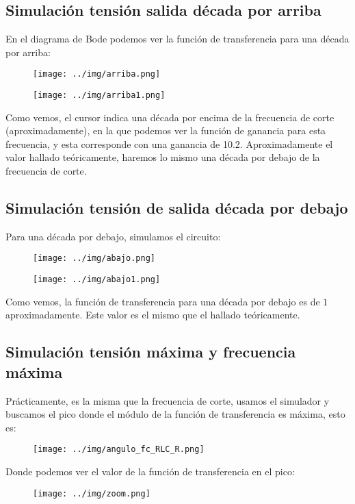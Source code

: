 \documentclass[11pt,letterpaper]{article}
\begin{document}
\subsection{Simulación tensión salida década por arriba}
En el diagrama de Bode podemos ver la función de transferencia para una década por arriba:
\begin{figure}[H]
    \centering
    \texttt{[image: ../img/arriba.png]}
    \label{fig:}
\end{figure}
\begin{figure}[H]
    \centering
    \texttt{[image: ../img/arriba1.png]}
    \label{fig:}
\end{figure}
Como vemos, el cursor indica una década por encima de la frecuencia de corte (aproximadamente), en la que podemos ver la función de ganancia para esta frecuencia, y esta corresponde con una ganancia de 10.2. Aproximadamente el valor hallado teóricamente, haremos lo mismo una década por debajo de la frecuencia de corte.
\subsection{Simulación tensión de salida década por debajo}
Para una década por debajo, simulamos el circuito:
\begin{figure}[H]
    \centering
    \texttt{[image: ../img/abajo.png]}
\end{figure}    

\begin{figure}[H]
    \centering
    \texttt{[image: ../img/abajo1.png]}
    \label{fig:-}
\end{figure}
Como vemos, la función de transferencia para una década por debajo es de $1$ aproximadamente. Este valor es el mismo que el hallado teóricamente. 

\subsection{Simulación tensión máxima y frecuencia máxima}
Prácticamente, es la misma que la frecuencia de corte, usamos el simulador y buscamos el pico donde el módulo de la función de transferencia es máxima, esto es:
\begin{figure}[H]
    \centering
    \texttt{[image: ../img/angulo\_fc\_RLC\_R.png]}
    \label{fig:}
\end{figure}
Donde podemos ver el valor de la función de transferencia en el pico:
\begin{figure}[H]
    \centering
    \texttt{[image: ../img/zoom.png]}
    \label{fig:-img-zoom-png}
\end{figure}
\end{document}
